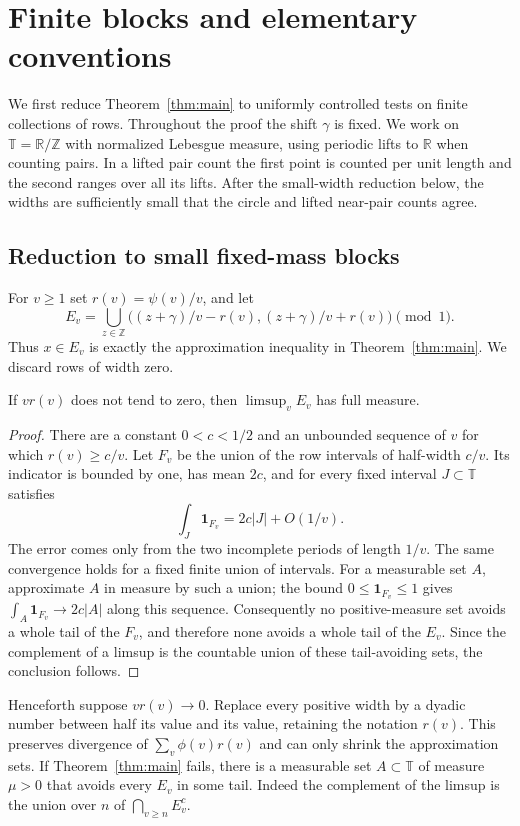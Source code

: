 \section{Finite blocks and elementary conventions}
\label{sec:preliminaries}

We first reduce Theorem~\ref{thm:main} to uniformly controlled tests on
finite collections of rows. Throughout the proof the shift $\gamma$ is
fixed. We work on $\mathbb T=\mathbb R/\mathbb Z$ with normalized
Lebesgue measure, using periodic lifts to $\mathbb R$ when counting pairs.
In a lifted pair count the first point is counted per unit length and the
second ranges over all its lifts. After the small-width reduction below,
the widths are sufficiently small that the circle and lifted near-pair
counts agree.

\subsection{Reduction to small fixed-mass blocks}

For $v\ge1$ set $r(v)=\psi(v)/v$, and let
\[
 E_v=\bigcup_{z\in\mathbb Z}
 \bigl((z+\gamma)/v-r(v),(z+\gamma)/v+r(v)\bigr)
 \pmod1.
\]
Thus $x\in E_v$ is exactly the approximation inequality in
Theorem~\ref{thm:main}. We discard rows of width zero.

\begin{lemma}\label{pre:large-widths}
If $v r(v)$ does not tend to zero, then $\limsup_v E_v$ has full measure.
\end{lemma}
\begin{proof}
There are a constant $0<c<1/2$ and an unbounded sequence of $v$ for which
$r(v)\ge c/v$. Let $F_v$ be the union of the row intervals of half-width $c/v$.
Its indicator is bounded by one, has mean $2c$, and for every fixed
interval $J\subset\mathbb T$ satisfies
\[
 \int_J\mathbf1_{F_v}=2c|J|+O(1/v).
\]
The error comes only from the two incomplete periods of length $1/v$.
The same convergence holds for a fixed finite union of intervals.
For a measurable set $A$, approximate $A$ in measure by such a union;
the bound $0\le\mathbf1_{F_v}\le1$ gives
$\int_A\mathbf1_{F_v}\to2c|A|$ along this sequence.
Consequently no positive-measure set avoids a whole tail of the $F_v$,
and therefore none avoids a whole tail of the $E_v$. Since the complement
of a limsup is the countable union of these tail-avoiding sets, the
conclusion follows.
\end{proof}

Henceforth suppose $v r(v)\to0$. Replace every positive width by a
dyadic number between half its value and its value, retaining the notation
$r(v)$. This preserves divergence of $\sum_v\phi(v)r(v)$ and can only
shrink the approximation sets. If Theorem~\ref{thm:main} fails, there is a measurable
set $A\subset\mathbb T$ of measure $\mu>0$ that avoids every $E_v$ in
some tail. Indeed the complement of the limsup is the union over $n$ of
$\bigcap_{v\ge n}E_v^c$.

